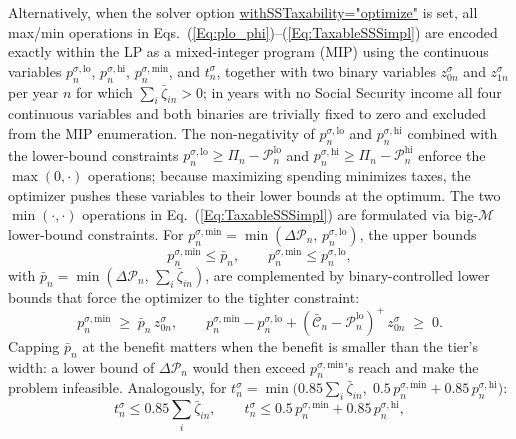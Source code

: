 \documentclass[fleqn,12pt]{report}
\newcommand{\code}[1]{\url{#1}}
\begin{document}
	Alternatively, when the solver option \code{withSSTaxability="optimize"} is set,
	all max/min operations in
	Eqs.~(\ref{Eq:plo_phi})--(\ref{Eq:TaxableSSSimpl}) are encoded exactly within the
	LP as a mixed-integer program (MIP) using the continuous variables
	$p^{\sigma,\mathrm{lo}}_n$, $p^{\sigma,\mathrm{hi}}_n$, $p^{\sigma,\mathrm{min}}_n$, and
	$t^{\sigma}_n$, together with two binary variables $z^{\sigma}_{0n}$ and
	$z^{\sigma}_{1n}$ per year $n$ for which $\sum_i\bar{\zeta}_{in}>0$;
	in years with no Social Security income all four continuous variables and
	both binaries are trivially fixed to zero and excluded from the MIP enumeration.
	The non-negativity of $p^{\sigma,\mathrm{lo}}_n$ and $p^{\sigma,\mathrm{hi}}_n$
	combined with the lower-bound constraints
	$p^{\sigma,\mathrm{lo}}_n \ge \Pi_n - \mathcal{P}^{\mathrm{lo}}_n$ and
	$p^{\sigma,\mathrm{hi}}_n \ge \Pi_n - \mathcal{P}^{\mathrm{hi}}_n$
	enforce the $\max(0,\cdot)$ operations; because maximizing spending minimizes taxes,
	the optimizer pushes these variables to their lower bounds at the optimum.
	The two $\min(\cdot,\cdot)$ operations in Eq.~(\ref{Eq:TaxableSSSimpl}) are
	formulated via big-$\mathcal{M}$ lower-bound constraints.
	For $p^{\sigma,\mathrm{min}}_n = \min(\Delta\mathcal{P}_n,\,p^{\sigma,\mathrm{lo}}_n)$,
	the upper bounds
	\begin{equation}
		p^{\sigma,\mathrm{min}}_n \le \bar{p}_n,
		\qquad
		p^{\sigma,\mathrm{min}}_n \le p^{\sigma,\mathrm{lo}}_n,
	\end{equation}
	with $\bar{p}_n = \min(\Delta\mathcal{P}_n,\,\sum_i\bar{\zeta}_{in})$, are complemented by
	binary-controlled lower bounds that force the optimizer to the tighter constraint:
	\begin{equation}
		\label{Eq:BinQ}
		p^{\sigma,\mathrm{min}}_n \;\ge\; \bar{p}_n\,z^{\sigma}_{0n},
		\qquad
		p^{\sigma,\mathrm{min}}_n - p^{\sigma,\mathrm{lo}}_n
		+ (\bar{\mathcal{C}}_n - \mathcal{P}^{\mathrm{lo}}_n)^+\,z^{\sigma}_{0n} \;\ge\; 0.
	\end{equation}
	Capping $\bar{p}_n$ at the benefit matters when the benefit is smaller than the tier's
	width: a lower bound of $\Delta\mathcal{P}_n$ would then exceed $p^{\sigma,\mathrm{min}}_n$'s
	reach and make the problem infeasible.
	Analogously, for
	$t^{\sigma}_n = \min\bigl(0.85\sum_i\bar{\zeta}_{in},\;
	                            0.5\,p^{\sigma,\mathrm{min}}_n+0.85\,p^{\sigma,\mathrm{hi}}_n\bigr)$:
	\begin{equation}
		t^{\sigma}_n \le 0.85\!\sum_i\bar{\zeta}_{in},
		\qquad
		t^{\sigma}_n \le 0.5\,p^{\sigma,\mathrm{min}}_n + 0.85\,p^{\sigma,\mathrm{hi}}_n,
	\end{equation}
\end{document}
